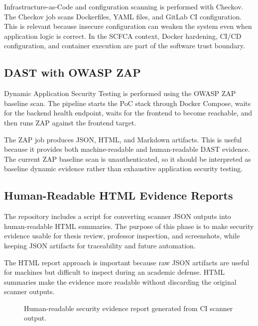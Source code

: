 \documentclass[12pt,a4paper]{report}
\begin{document}
Infrastructure-as-Code and configuration scanning is performed with Checkov. The Checkov job scans Dockerfiles, YAML files, and GitLab CI configuration. This is relevant because insecure configuration can weaken the system even when application logic is correct. In the SCFCA context, Docker hardening, CI/CD configuration, and container execution are part of the software trust boundary.

\subsection{DAST with OWASP ZAP}

Dynamic Application Security Testing is performed using the OWASP ZAP baseline scan. The pipeline starts the PoC stack through Docker Compose, waits for the backend health endpoint, waits for the frontend to become reachable, and then runs ZAP against the frontend target.

The ZAP job produces JSON, HTML, and Markdown artifacts. This is useful because it provides both machine-readable and human-readable DAST evidence. The current ZAP baseline scan is unauthenticated, so it should be interpreted as baseline dynamic evidence rather than exhaustive application security testing.

\subsection{Human-Readable HTML Evidence Reports}

The repository includes a script for converting scanner JSON outputs into human-readable HTML summaries. The purpose of this phase is to make security evidence usable for thesis review, professor inspection, and screenshots, while keeping JSON artifacts for traceability and future automation.

The HTML report approach is important because raw JSON artifacts are useful for machines but difficult to inspect during an academic defense. HTML summaries make the evidence more readable without discarding the original scanner outputs.

\begin{figure}[htbp]
    \centering
    \caption{Human-readable security evidence report generated from CI scanner output.}
    \label{fig:scfca-html-security-report-placeholder}
\end{figure}
\end{document}
